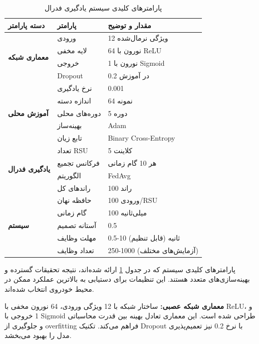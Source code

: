 \documentclass[11pt]{article}
\begin{document}
\begin{table}[h]
\centering
\begin{tabular}{|p{4cm}|p{3cm}|p{6cm}|}
\hline
\textbf{دسته پارامتر} & \textbf{پارامتر} & \textbf{مقدار و توضیح} \\
\hline

\multirow{4}{*}{\textbf{معماری شبکه}} 
& ورودی & 12 ویژگی نرمال‌شده \\
\cline{2-3}
& لایه مخفی & 64 نورون با ReLU \\
\cline{2-3}
& خروجی & 1 نورون با Sigmoid \\
\cline{2-3}
& Dropout & 0.2 در آموزش \\
\hline

\multirow{5}{*}{\textbf{آموزش محلی}} 
& نرخ یادگیری & 0.001 \\
\cline{2-3}
& اندازه دسته & 64 نمونه \\
\cline{2-3}
& دوره‌های محلی & 5 دوره \\
\cline{2-3}
& بهینه‌ساز & Adam \\
\cline{2-3}
& تابع زیان & Binary Cross-Entropy \\
\hline

\multirow{4}{*}{\textbf{یادگیری فدرال}} 
& تعداد RSU & 5 کلاینت \\
\cline{2-3}
& فرکانس تجمیع & هر 10 گام زمانی \\
\cline{2-3}
& الگوریتم & FedAvg \\
\cline{2-3}
& راندهای کل & 100 راند \\
\hline

\multirow{5}{*}{\textbf{سیستم}} 
& حافظه نهان & 100 ورودی/RSU \\
\cline{2-3}
& گام زمانی & 100 میلی‌ثانیه \\
\cline{2-3}
& آستانه تصمیم & 0.5 \\
\cline{2-3}
& مهلت وظایف & 0.5-10 ثانیه (قابل تنظیم) \\
\cline{2-3}
& تعداد وظایف & 250-1000 (آزمایش‌های مختلف) \\
\hline

\end{tabular}
\caption{پارامترهای کلیدی سیستم یادگیری فدرال}
\label{tab:fedparam}
\end{table}

پارامترهای کلیدی سیستم که در جدول \ref{tab:fedparam} ارائه شده‌اند، نتیجه تحقیقات گسترده و بهینه‌سازی‌های متعدد هستند. این تنظیمات برای دستیابی به بالاترین عملکرد ممکن در محیط خودروی انتخاب شده‌اند.

\textbf{معماری شبکه عصبی:} ساختار شبکه با 12 ویژگی ورودی، 64 نورون مخفی با ReLU، و 1 خروجی با Sigmoid طراحی شده است. این معماری تعادل بهینه بین قدرت محاسباتی و جلوگیری از overfitting فراهم می‌کند. تکنیک Dropout با نرخ 0.2 نیز تعمیم‌پذیری مدل را بهبود می‌بخشد.
\end{document}
